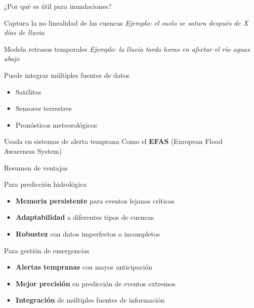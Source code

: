 \documentclass[
  ignorenonframetext,
]{beamer}
\providecommand{\tightlist}{%
  \setlength{\itemsep}{0pt}\setlength{\parskip}{0pt}}
\begin{document}
\begin{frame}{¿Por qué es útil para inundaciones?}
\label{por-quuxe9-es-uxfatil-para-inundaciones}
\begin{block}{Captura la no linealidad de las cuencas}
\label{captura-la-no-linealidad-de-las-cuencas}
\emph{Ejemplo: el suelo se satura después de X días de lluvia}
\end{block}

\begin{block}{Modela retrasos temporales}
\label{modela-retrasos-temporales}
\emph{Ejemplo: la lluvia tarda horas en afectar el río aguas abajo}
\end{block}

\begin{block}{Puede integrar múltiples fuentes de datos}
\label{puede-integrar-muxfaltiples-fuentes-de-datos}
\begin{itemize}
\tightlist
\item
  Satélites
\item
  Sensores terrestres\\
\item
  Pronósticos meteorológicos
\end{itemize}
\end{block}

\begin{block}{Usada en sistemas de alerta temprana}
\label{usada-en-sistemas-de-alerta-temprana}
Como el \textbf{EFAS} (European Flood Awareness System)
\end{block}
\end{frame}

\begin{frame}{Resumen de ventajas}
\label{resumen-de-ventajas}
\begin{block}{Para predicción hidrológica}
\label{para-predicciuxf3n-hidroluxf3gica}
\begin{itemize}
\tightlist
\item
  \textbf{Memoria persistente} para eventos lejanos críticos
\item
  \textbf{Adaptabilidad} a diferentes tipos de cuencas
\item
  \textbf{Robustez} con datos imperfectos o incompletos
\end{itemize}
\end{block}

\begin{block}{Para gestión de emergencias}
\label{para-gestiuxf3n-de-emergencias}
\begin{itemize}
\tightlist
\item
  \textbf{Alertas tempranas} con mayor anticipación
\item
  \textbf{Mejor precisión} en predicción de eventos extremos
\item
  \textbf{Integración} de múltiples fuentes de información
\end{itemize}
\end{block}
\end{frame}
\end{document}
